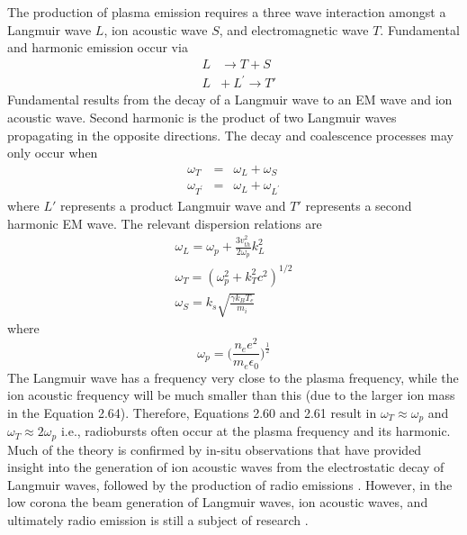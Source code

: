 
The production of plasma emission requires a three wave interaction amongst a Langmuir wave $L$, ion acoustic wave $S$, and electromagnetic wave $T$. Fundamental and harmonic emission occur via 
\begin{eqnarray}
&L& \rightarrow T + S \\
&L& + ~L^{'}\rightarrow T'
\end{eqnarray}
Fundamental results from the decay of a Langmuir wave to an EM wave and ion acoustic wave. Second harmonic is the product of two Langmuir waves propagating in the opposite directions. The decay and coalescence processes may only occur when
\begin{eqnarray}
\omega_T & = & \omega_L + \omega_S \\
\omega_{T^{'}} & = & \omega_L + \omega_{L^{'}}
\end{eqnarray}
where $L'$ represents a product Langmuir wave and $T'$ represents a second harmonic EM wave. The relevant dispersion relations are 
\begin{eqnarray}
\omega_L = \omega_p + \frac{3v_{th}^2}{2\omega_p}k_L^2 \\
\omega_T = (\omega_p^2 +k_T^2c^2)^{1/2} \\
\omega_S = k_s\sqrt{\frac{\gamma k_B T_e}{m_i}}
\end{eqnarray}
where
\begin{equation}
\omega_p = \bigg(\frac{n_e e^2}{m_e \epsilon_0}\bigg)^\frac{1}{2}
\label{eqn:plasma_frequency}
\end{equation}
The Langmuir wave has a frequency very close to the plasma frequency, while the ion acoustic frequency will be much smaller than this (due to the larger ion mass in the Equation 2.64). Therefore, Equations 2.60 and 2.61 result in $\omega_T \approx \omega_p$ and $\omega_T\approx 2\omega_p$ i.e., radiobursts often occur at the plasma frequency and its harmonic. Much of the theory is confirmed by in-situ observations that have provided insight into the generation of ion acoustic waves from the electrostatic decay of Langmuir waves, followed by the production of radio emissions \citep{thejappa1998}. However, in the low corona the beam generation of Langmuir waves, ion acoustic waves, and ultimately radio emission is still a subject of research \citep{kontar2001, reid2010, ratcliffe2012}.

